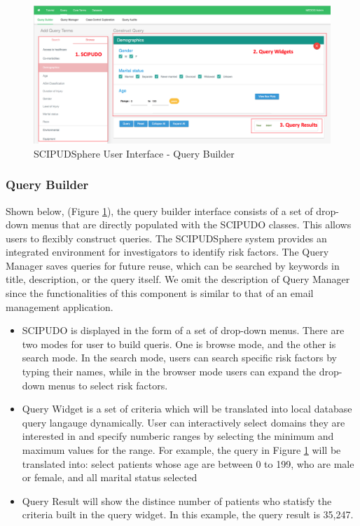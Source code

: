 \documentclass{amia}
\begin{document}
\begin{figure}[h!]
  \centering
  \includegraphics[scale=0.4]{pics/interface.png}
  \caption{SCIPUDSphere User Interface - Query Builder}
  \label{interface}
\end{figure}

\subsubsection{Query Builder}
Shown below, (Figure \ref{interface}), the query builder interface consists of a set of drop-down menus that are directly populated with the SCIPUDO classes. This allows users to flexibly construct queries. The SCIPUDSphere system provides an integrated environment for investigators to identify risk factors. The Query Manager saves queries for future reuse, which can be searched by keywords in title, description, or the query itself. We omit the description of Query Manager since the functionalities of this component is similar to that of an email management application.

\vspace{-3mm}
\begin{itemize}
\setlength\itemsep{0em}
  \item SCIPUDO is displayed in the form of a set of drop-down menus. There are two modes for user to build queris. One is browse mode, and the other is search mode. In the search mode, users can search specific risk factors by typing their names, while in the browser mode users can expand the drop-down menus to select risk factors.
  \item Query Widget is a set of criteria which will be translated into local database query langauge dynamically. User can interactively select domains they are interested in and specify numberic ranges by selecting the minimum and maximum values for the range. For example, the query in Figure \ref{interface} will be translated into: select patients whose age are between 0 to 199, who are male or female, and all marital status selected
  \item Query Result will show the distince number of patients who statisfy the criteria built in the query widget. In this example, the query result is 35,247.
\end{itemize}
\vspace{-3mm}
\end{document}
